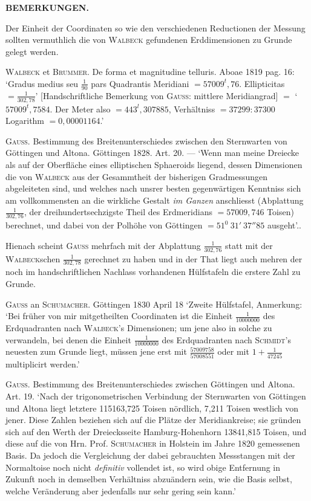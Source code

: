 \clearpage{}%
\begin{center}\textbf{BEMERKUNGEN.}\end{center}

\indent Der Einheit der Coordinaten so wie den verschiedenen Reductionen der Messung sollten vermuthlich die von \textsc{Walbeck} gefundenen Erddimensionen zu Grunde gelegt werden.

\textsc{Walbeck} et \textsc{Brummer}. De forma et magnitudine telluris. Aboae 1819 pag. 16: ‘Gradus medius seu \(\frac{1}{90}\) pars Quadrantis Meridiani \(=57009^{t}{,}76\). Ellipticitas \(=\frac{1}{302{,}78}\)’ [Handschriftliche Bemerkung von \textsc{Gauss}: mittlere Meridiangrad] \(=\) ‘\(57009^{t}{,}7584\). Der Meter also \(=443^{l}{,}307885\), Verhältniss \(=37299:37300\) Logarithm \(=0{,}00001164\).’

\textsc{Gauss}. Bestimmung des Breitenunterschiedes zwischen den Sternwarten von Göttingen und Altona. Göttingen 1828. Art. 20. — ‘Wenn man meine Dreiecke als auf der Oberfläche eines elliptischen Sphaeroids liegend, dessen Dimensionen die von \textsc{Walbeck} aus der Gesammtheit der bisherigen Gradmessungen abgeleiteten sind, und welches nach unsrer besten gegenwärtigen Kenntniss sich am vollkommensten an die wirkliche Gestalt \textit{im Ganzen} anschliesst (Abplattung \(\frac{1}{302{,}76}\), der dreihundertsechzigste Theil des Erdmeridians \(=57009{,}746\) Toisen) berechnet, und dabei von der Polhöhe von Göttingen \(=51^{0}\ 31'\ 37''85\) ausgeht’..

Hienach scheint \textsc{Gauss} mehrfach mit der Abplattung \(\frac{1}{302{,}76}\) statt mit der \textsc{Walbeck}schen \(\frac{1}{302{,}78}\) gerechnet zu haben und in der That liegt auch mehren der noch im handschriftlichen Nachlass vorhandenen Hülfstafeln die erstere Zahl zu Grunde.

\textsc{Gauss} an \textsc{Schumacher}. Göttingen 1830 April 18 ‘Zweite Hülfstafel, Anmerkung: ‘Bei früher von mir mitgetheilten Coordinaten ist die Einheit \(\frac{1}{10000000}\) des Erdquadranten nach \textsc{Walbeck}’s Dimensionen; um jene also in solche zu verwandeln, bei denen die Einheit \(\frac{1}{10000000}\) des Erdquadranten nach \textsc{Schmidt}’s neuesten zum Grunde liegt, müssen jene erst mit \(\frac{57009758}{57008551}\) oder mit \(1+\frac{1}{47245}\) multiplicirt werden.’

\textsc{Gauss}. Bestimmung des Breitenunterschiedes zwischen Göttingen und Altona. Art. 19. ‘Nach der trigonometrischen Verbindung der Sternwarten von Göttingen und Altona liegt letztere 115163,725 Toisen nördlich, 7,211 Toisen westlich von jener. Diese Zahlen beziehen sich auf die Plätze der Meridiankreise; sie gründen sich auf den Werth der Dreiecksseite Hamburg-Hohenhorn 13841,815 Toisen, und diese auf die von Hrn. Prof. \textsc{Schumacher} in Holstein im Jahre 1820 gemessenen Basis. Da jedoch die Vergleichung der dabei gebrauchten Messstangen mit der Normaltoise noch nicht \textit{definitiv} vollendet ist, so wird obige Entfernung in Zukunft noch in demselben Verhältniss abzuändern sein, wie die Basis selbst, welche Veränderung aber jedenfalls nur sehr gering sein kann.’

